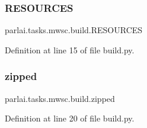 \subsubsection{\texorpdfstring{R\+E\+S\+O\+U\+R\+C\+ES}{RESOURCES}}
{\footnotesize\ttfamily parlai.\+tasks.\+mwsc.\+build.\+R\+E\+S\+O\+U\+R\+C\+ES}



Definition at line 15 of file build.\+py.

\mbox{\label{namespaceparlai_1_1tasks_1_1mwsc_1_1build_a3739cb2c63f7061eac5167f7d0f7c290}} 
\subsubsection{\texorpdfstring{zipped}{zipped}}
{\footnotesize\ttfamily parlai.\+tasks.\+mwsc.\+build.\+zipped}



Definition at line 20 of file build.\+py.

